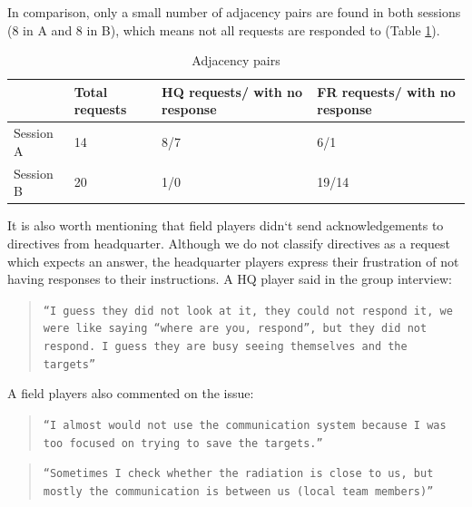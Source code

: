 In comparison, only a small number of adjacency pairs are found in both sessions (8 in A and 8 in B), which means not all requests are responded to (Table \ref{tab:adjpairs}).\\



\begin{table}[h]
\footnotesize
\begin{tabular}{l|p{3cm}p{3cm}p{3cm}}
          & Total requests & HQ requests/ with no response & FR requests/ with no response \\ \hline
Session A & 14                                 & 8/7                                               & 6/1                                                \\
Session B & 20                                 & 1/0                                               & 19/14                                             
\end{tabular}
\caption{Adjacency pairs}
\label{tab:adjpairs}
\end{table}

It is also worth mentioning that field players didn`t send acknowledgements to directives from headquarter. Although we do not classify directives as a request which expects an answer, the headquarter players express their frustration of not having responses to their instructions. A HQ player said in the group interview:\\
\begin{quote}
\texttt{``I guess they did not look at it, they could not respond it, we were like saying ``where are you, respond'', but they did not respond. I guess they are busy seeing themselves and the targets''}
\end{quote}

A field players also commented on the issue:\\

\begin{quote}
\texttt{``I almost would not use the communication system because I was too focused on trying to save the targets.''}
\end{quote}

\begin{quote}
\texttt{``Sometimes I check whether the radiation is close to us, but mostly the communication is between us (local team members)''}
\end{quote}

